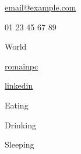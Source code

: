 \documentclass[11pt]{spidercv}
\begin{document}
    \begin{TopBar}{\ColorTextSide}

        \begin{DoubleColumns}
            \begin{ItemList}{\ColorHighlight}
                \item [\Large\faAt] \href{mailto:email@example.com}{email@example.com}
                \item [\Large\faMobile] 01 23 45 67 89
                \item [\Large\faMapMarker] World
            \end{ItemList}
            \nextcolumn
            \begin{ItemList}{\ColorHighlight}
                \item [\Large\faGithub] \href{https://github.com/ROMAINPC/Spider-CV}{romainpc}
                \item [\Large\faLinkedinSquare] \href{https://www.linkedin.com/}{linkedin}
            \end{ItemList}
        \end{DoubleColumns}

        \begin{TripleColumns}
            \begin{ItemList}{\ColorHighlight}
                \item [] Eating
            \end{ItemList}
            \nextcolumn
            \begin{ItemList}{\ColorHighlight}
                \item [] Drinking
            \end{ItemList}
            \nextcolumn
            \begin{ItemList}{\ColorHighlight}
                \item [] Sleeping
            \end{ItemList}
        \end{TripleColumns}
    \end{TopBar}
\end{document}
